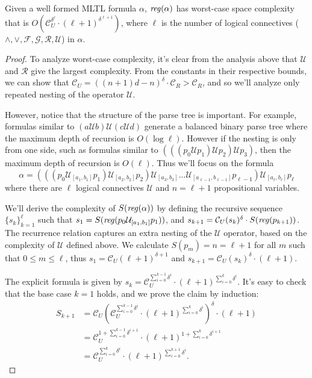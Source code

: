 \documentclass[runningheads]{llncs}
\begin{document}
\begin{theorem}
Given a well formed MLTL formula $\alpha$, $\text{\emph{reg}}(\alpha)$ has worst-case space complexity that is $O(\mathcal{C}_U^{\delta ^ \ell} \cdot (\ell + 1)^{\delta^{\ell + 1}})$, where $\ell$ is the number of logical connectives ($\land, \lor, \mathcal{F}, \mathcal{G}, \mathcal{R}, \mathcal{U}$) in $\alpha$. 
\end{theorem}
\begin{proof}
    To analyze worst-case complexity, it's clear from the analysis above that $\mathcal{U}$ and $\mathcal{R}$ give the largest complexity. From the constants in their respective bounds, we can show that $\mathcal{C}_U = ((n+1)d - n)^\delta \cdot \mathcal{C}_R > \mathcal{C}_R$, and so we'll analyze only repeated nesting of the operator $\mathcal{U}$.
    
    However, notice that the structure of the parse tree is important. For example, formulas similar to $(a \mathcal{U} b) \mathcal{U} (c \mathcal{U} d)$ generate a balanced binary parse tree where the maximum depth of recursion is $O(\log \ell)$. However if the nesting is only from one side, such as formulas similar to $(((p_0 \mathcal{U} p_1) \mathcal{U} p_2) \mathcal{U} p_3)$, then the maximum depth of recursion is $O(\ell)$. Thus we'll focus on the formula $$\alpha = (((p_0 \mathcal{U}_{[a_1, b_1]} p_1) \mathcal{U}_{[a_2, b_2]} p_2) \mathcal{U}_{[a_3, b_3]}... \mathcal{U}_{[a_{\ell - 1}, b_{\ell - 1}]} p_{\ell - 1}) \mathcal{U}_{[a_\ell, b_\ell]} p_\ell$$ where there are $\ell$ logical connectives $\mathcal{U}$ and $n = \ell + 1$ propositional variables. 
    
    We'll derive the complexity of $S(\text{\emph{reg}}(\alpha))$ by defining the recursive sequence $\{s_k\}_{k = 1}^\ell$ such that $s_1 = S(\text{\emph{reg}}(p_0 \mathcal{U}_{[a_1, b_1]} p_1))$, and $s_{k+1} = \mathcal{C}_U (s_k)^\delta \cdot S(\text{\emph{reg}}(p_{k+1}))$. The recurrence relation captures an extra nesting of the $\mathcal{U}$ operator, based on the complexity of $\mathcal{U}$ defined above. We calculate $S(p_m) = n = \ell + 1$ for all $m$ such that $0 \leq m \leq \ell$, thus $s_1 = \mathcal{C}_U(\ell + 1)^{\delta + 1}$ and $s_{k+1} = \mathcal{C}_U (s_k)^\delta \cdot (\ell + 1)$. 
    
    The explicit formula is given by $s_k = \mathcal{C}_U^{\sum_{i = 0}^{k - 1} \delta^i} \cdot (\ell + 1)^{\sum_{i = 0}^{k} \delta^i}$. It's easy to check that the base case $k = 1$ holds, and we prove the claim by induction:
    \begin{align*}
        S_{k + 1} &= \mathcal{C}_U (\mathcal{C}_U^{\sum_{i = 0}^{k - 1} \delta^i} \cdot (\ell + 1)^{\sum_{i = 0}^{k} \delta^i}) ^ \delta \cdot (\ell + 1) \\
        &= \mathcal{C}_U^{1 + \sum_{i = 0}^{k - 1} \delta^{i + 1}} \cdot (\ell + 1)^{1 + \sum_{i = 0}^{k} \delta^{i + 1}} \\
        &= \mathcal{C}_U^{\sum_{i = 0}^k \delta^i} \cdot (\ell + 1)^{\sum_{i = 0}^{k+1} \delta^i}.
    \end{align*}
    

\end{proof}
\end{document}
